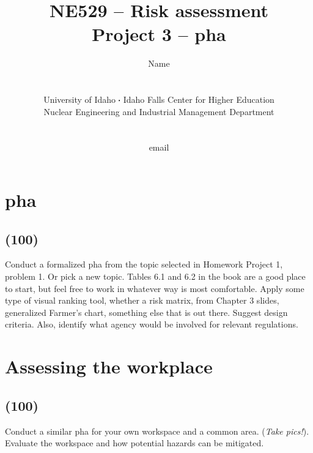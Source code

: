 \documentclass[11pt,a4paper]{article}
\newcommand*\sq{\mathbin{\vcenter{\hbox{\rule{.3ex}{.3ex}}}}} %
\newcommand{\acl}{\acrlong} %
\newcommand{\acs}{\acrshort} %
\begin{document}
\begin{titlepage}
    \title{
        NE529 -- Risk assessment\\
        Project 3 -- \acl{pha} \\
    }
    \author{
        Name
        \\ \\ \\
        University of Idaho $\sq$ Idaho Falls Center for Higher Education\\
        Nuclear Engineering and Industrial Management Department
        \\ \\ \\
        email 
    }
\clearpage %
\maketitle
\vspace*{\fill}
\thispagestyle{empty} %
\end{titlepage}


\section{\acs{pha}}
\subsection*{(100)}
Conduct a formalized \acs{pha} from the topic selected in Homework Project 1, problem 1. Or pick a new topic. Tables 6.1 and 6.2 in the book are a good place to start, but feel free to work in whatever way is most comfortable. Apply some type of visual ranking tool, whether a risk matrix, from Chapter 3 slides, generalized Farmer’s chart, something else that is out there. Suggest design criteria. Also, identify what agency would be involved for relevant regulations.





\newpage

\section{Assessing the workplace}
\subsection*{(100)}
Conduct a similar \acs{pha} for your own workspace and a common area. (\textit{Take pics!}). Evaluate the workspace and how potential hazards can be mitigated.
       
\end{document}
